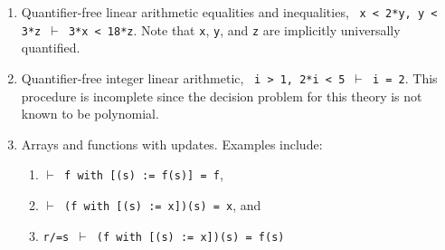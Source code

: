 \documentclass[12pt]{book}
\begin{document}
\begin{description}
\begin{enumerate}
\item Quantifier-free linear arithmetic equalities and inequalities, \eg\
\texttt{x < 2*y, y < 3*z $\vdash$ 3*x < 18*z}.  Note that \texttt{x},
\texttt{y}, and \texttt{z} are implicitly universally quantified.


\item Quantifier-free integer linear arithmetic, \eg\ \texttt{i > 1, 2*i <
5 $\vdash$ i = 2}.  This procedure is incomplete since the decision
problem for this theory is not known to be polynomial.

\item Arrays and functions with updates.  Examples include:
\begin{enumerate}
\item  \texttt{$\vdash$ f with [(s) := f(s)] = f},
\item  \texttt{$\vdash$ (f with [(s) := x])(s) = x}, and
\item  \texttt{r/=s $\vdash$ (f with [(s) := x])(s) = f(s)}
\end{enumerate}
\end{enumerate}


\end{description}
\end{document}
